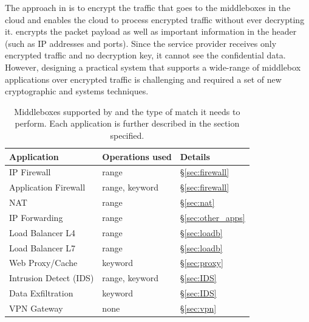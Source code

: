     The approach in \sys is to encrypt the traffic that goes to  the middleboxes in the cloud and enables the cloud to process encrypted traffic without ever decrypting it. \sys encrypts the packet payload as well as important information in the header (such as IP addresses and ports). Since the service provider receives only encrypted traffic and no decryption key, it cannot see the confidential data. However, designing a practical system that supports a wide-range of middlebox applications over encrypted traffic is challenging and required a set of new cryptographic and systems techniques.
    
    
    
    
\begin{table}[t!]
\centering
\begin{tabular}{p{3.2cm}|p{2.9cm}|p{1cm}}
{\bf Application}  & {\bf Operations used} & {\bf Details} \\
\hline \hline
IP Firewall &   range  & \S\ref{sec:firewall} \\
Application Firewall & range, keyword  & \S\ref{sec:firewall}\\
NAT & range  & \S\ref{sec:nat} \\
IP Forwarding  & range & \S\ref{sec:other_apps} \\
Load Balancer L4 & range & \S\ref{sec:loadb}\\
Load Balancer L7  & range & \S\ref{sec:loadb}\\
Web Proxy/Cache  & keyword & \S\ref{sec:proxy}\\
Intrusion Detect (IDS)  & range, keyword & \S\ref{sec:IDS}\\
Data Exfiltration  & keyword & \S\ref{sec:IDS} \\
VPN Gateway &  none & \S\ref{sec:vpn} \\ 
\end{tabular}
\caption{Middleboxes supported by \sys and the type of match it needs to perform. Each application is further described in the section specified. \label{tab:apps-ops} }
\end{table}

